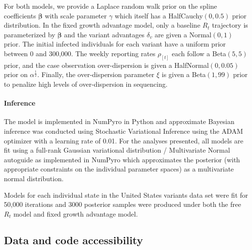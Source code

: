 \documentclass[11pt,oneside,letterpaper]{article}
\renewcommand{\vec}[1]{\boldsymbol{#1}}
\begin{document}
For both models, we provide a Laplace random walk prior on the spline coefficients $\vec{\beta}$ with scale parameter $\gamma$ which itself has a HalfCauchy$(0, 0.5)$ prior distribution.
In the fixed growth advantage model, only a baseline $R_{t}$ trajectory is parameterized by $\vec{\beta}$ and the variant advantages $\delta_{v}$ are given a Normal$(0,1)$ prior.
The initial infected individuals for each variant have a uniform prior between 0 and 300,000.
The weekly reporting rates $\rho_{[t]}$ each follow a Beta$(5, 5)$ prior, and the case observation over-dispersion is given a HalfNormal$(0, 0.05)$ prior on $\alpha^{\frac{1}{2}}$.
Finally, the over-dispersion parameter $\xi$ is given a Beta$(1, 99)$ prior to penalize high levels of over-dispersion in sequencing.

\paragraph{Inference}

The model is implemented in NumPyro \cite{phan2019composable} in Python and approximate Bayesian inference was conducted using Stochastic Variational Inference \cite{hoffman2013svi} using the ADAM optimizer \cite{kingma2017adam} with a learning rate of 0.01. For the analyses presented, all models are fit using a full-rank Gaussian variational distribution / Multivariate Normal autoguide as implemented in NumPyro \cite{phan2019composable} which approximates the posterior (with appropriate constraints on the individual parameter spaces) as a multivariate normal distribution.

Models for each individual state in the United States variants data set were fit for 50,000 iterations and 3000 posterior samples were produced under both the free $R_{t}$ model and fixed growth advantage model.

\subsection*{Data and code accessibility}
\end{document}

